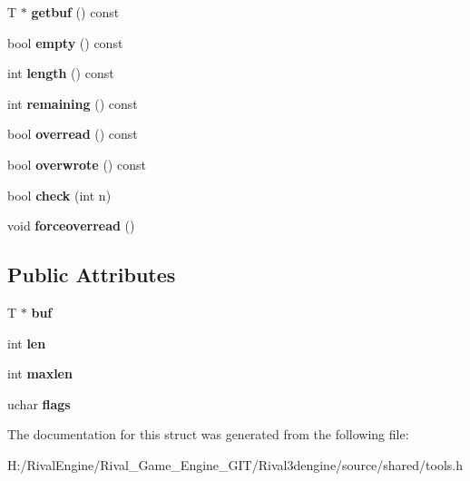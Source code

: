 \begin{DoxyCompactItemize}
T $\ast$ {\bfseries getbuf} () const
\item 
\mbox{\label{structdatabuf_ac462a5159900a306d67117cabbbf17db}} 
bool {\bfseries empty} () const
\item 
\mbox{\label{structdatabuf_a49524245867f8f8b7a7e8d5a6c2e9afa}} 
int {\bfseries length} () const
\item 
\mbox{\label{structdatabuf_a9e6bb0d4a4c7e47495c1b33d9856337e}} 
int {\bfseries remaining} () const
\item 
\mbox{\label{structdatabuf_a7c8c5031dcedbf681924e5166ea190ae}} 
bool {\bfseries overread} () const
\item 
\mbox{\label{structdatabuf_af6060c72019fdeaf82ea0810091800b6}} 
bool {\bfseries overwrote} () const
\item 
\mbox{\label{structdatabuf_a058c8df40617db3950380737db05bc9a}} 
bool {\bfseries check} (int n)
\item 
\mbox{\label{structdatabuf_a9b2f3053e983a1a13f996d075a2307ac}} 
void {\bfseries forceoverread} ()
\end{DoxyCompactItemize}
\subsection*{Public Attributes}
\begin{DoxyCompactItemize}
\item 
\mbox{\label{structdatabuf_aef32e06b0075f5a381828441812c1b72}} 
T $\ast$ {\bfseries buf}
\item 
\mbox{\label{structdatabuf_a2b4059e109b57415a9b3425364f6529c}} 
int {\bfseries len}
\item 
\mbox{\label{structdatabuf_ade4f8ac2ce53d313a1b1024eafcae9f2}} 
int {\bfseries maxlen}
\item 
\mbox{\label{structdatabuf_a90dff9f73f4103c4ff0cc151de2c12b3}} 
uchar {\bfseries flags}
\end{DoxyCompactItemize}


The documentation for this struct was generated from the following file\+:\begin{DoxyCompactItemize}
\item 
H\+:/\+Rival\+Engine/\+Rival\+\_\+\+Game\+\_\+\+Engine\+\_\+\+G\+I\+T/\+Rival3dengine/source/shared/tools.\+h\end{DoxyCompactItemize}
